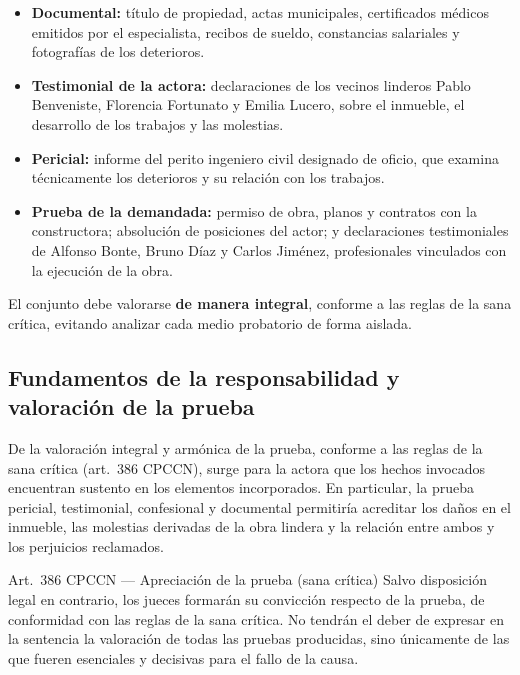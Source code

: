 \documentclass[12pt,oneside]{book}
\begin{document}
\begin{itemize}
    \item \textbf{Documental:} t\'itulo de propiedad, actas municipales, certificados m\'edicos emitidos por el especialista, recibos de sueldo, constancias salariales y fotograf\'ias de los deterioros.
    \item \textbf{Testimonial de la actora:} declaraciones de los vecinos linderos Pablo Benveniste, Florencia Fortunato y Emilia Lucero, sobre el inmueble, el desarrollo de los trabajos y las molestias.
    \item \textbf{Pericial:} informe del perito ingeniero civil designado de oficio, que examina t\'ecnicamente los deterioros y su relaci\'on con los trabajos.
    \item \textbf{Prueba de la demandada:} permiso de obra, planos y contratos con la constructora; absoluci\'on de posiciones del actor; y declaraciones testimoniales de Alfonso Bonte, Bruno D\'iaz y Carlos Jim\'enez, profesionales vinculados con la ejecuci\'on de la obra.
\end{itemize}

El conjunto debe valorarse \textbf{de manera integral}, conforme a las reglas de la sana cr\'itica, evitando analizar cada medio probatorio de forma aislada.

\subsection{Fundamentos de la responsabilidad y valoraci\'on de la prueba}

De la valoraci\'on integral y arm\'onica de la prueba, conforme a las reglas de la sana cr\'itica (art.~386 CPCCN), surge para la actora que los hechos invocados encuentran sustento en los elementos incorporados. En particular, la prueba pericial, testimonial, confesional y documental permitir\'ia acreditar los da\~nos en el inmueble, las molestias derivadas de la obra lindera y la relaci\'on entre ambos y los perjuicios reclamados.

\begin{norma}{Art.~386 CPCCN --- Apreciaci\'on de la prueba (sana cr\'itica)}
Salvo disposici\'on legal en contrario, los jueces formar\'an su convicci\'on respecto de la prueba, de conformidad con las reglas de la sana cr\'itica. No tendr\'an el deber de expresar en la sentencia la valoraci\'on de todas las pruebas producidas, sino \'unicamente de las que fueren esenciales y decisivas para el fallo de la causa.
\end{norma}
\end{document}
